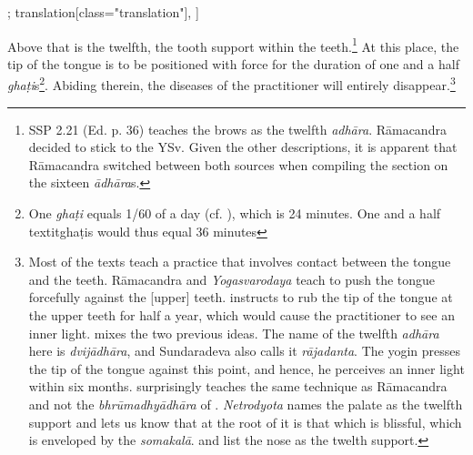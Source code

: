 \begin{alignment}[
  texts=edition[class="edition"];
  translation[class="translation"],
  ]
\begin{translation}
\begin{tlate}[p30_04]
      Above that is the twelfth, the tooth support within the teeth.\footnote{SSP 2.21 (Ed. p. 36) teaches the brows as the twelfth \textit{adhāra}. Rāmacandra decided to stick to the YSv. Given the other descriptions, it is apparent that Rāmacandra switched between both sources when compiling the section on the sixteen \textit{ādhāra}s.} At this place, the tip of the tongue is to be positioned with force for the duration of one and a half \textit{ghaṭi}s\footnote{One \textit{ghaṭi} equals 1/60 of a day (cf. \citeauthor[1966: 114]{sircar1966}), which is 24 minutes. One and a half textit{ghaṭi}s would thus equal 36 minutes}. Abiding therein, the diseases of the practitioner will entirely disappear.\footnote{Most of the texts teach a practice that involves contact between the tongue and the teeth. Rāmacandra and \textit{Yogasvarodaya} teach to push the tongue forcefully against the [upper] teeth.  instructs to rub the tip of the tongue at the upper teeth for half a year, which would cause the practitioner to see an inner light.  mixes the two previous ideas. The name of the twelfth \textit{adhāra} here is \textit{dvijādhāra}, and Sundaradeva also calls it \textit{rājadanta}. The yogin presses the tip of the tongue against this point, and hence, he perceives an inner light within six months.  surprisingly teaches the same technique as Rāmacandra and not the \textit{bhrūmadhyādhāra} of . \textit{Netrodyota} names the palate as the twelfth support and lets us know that at the root of it is that which is blissful, which is enveloped by the \textit{somakalā}.  and  list the nose as the twelth support.}    
\flushpage 
      \end{tlate}
  \end{translation}
\end{alignment}
\pagebreak %
